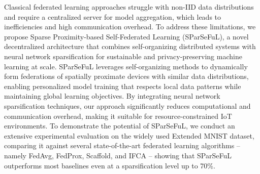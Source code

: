 \documentclass[runningheads]{llncs}
\begin{document}
\begin{enumerate}
    Classical federated learning approaches struggle with non-IID data distributions and require a centralized server for model aggregation, 
     which leads to inefficiencies and high communication overhead.
    To address these limitations, we propose Sparse Proximity-based Self-Federated Learning (SParSeFuL), 
     a novel decentralized architecture that combines self-organizing distributed systems with neural network 
     sparsification for sustainable and privacy-preserving machine learning at scale.
    SParSeFuL leverages self-organizing methods to dynamically form federations of spatially proximate devices with similar data distributions, 
     enabling personalized model training that respects local data patterns while maintaining global learning objectives.
    By integrating neural network sparsification techniques, our approach significantly reduces computational and communication overhead, 
     making it suitable for resource-constrained IoT environments.
    To demonstrate the potential of SParSeFuL, we conduct an extensive experimental evaluation on the widely 
    used Extended MNIST dataset, comparing it against several state-of-the-art federated learning algorithms -- namely 
    FedAvg, FedProx, Scaffold, and IFCA -- showing that SParSeFuL outperforms most baselines even 
    at a sparsification level up to 70\%.

    
\end{enumerate}
\end{document}
